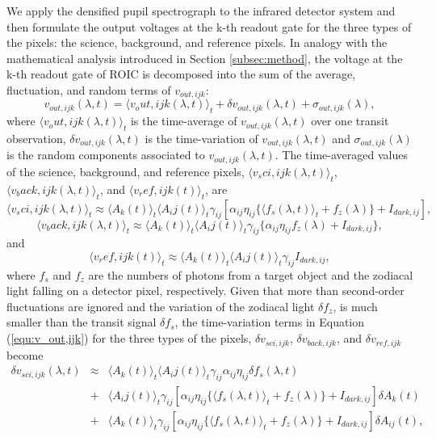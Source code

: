 \documentclass{aastex62}
\def\hoge<#1>{\langle #1 \rangle}
\begin{document}
We apply the densified pupil spectrograph to the infrared detector system and then formulate the output voltages at the k-th readout gate for the three types of the pixels: the science, background, and reference pixels. In analogy with the mathematical analysis introduced in Section \ref{subsec:method}, the voltage at the k-th readout gate of ROIC is decomposed into the sum of the average, fluctuation, and random terms of $v_{out,ijk}$:
\begin{equation}
\label{equ:v_out,ijk}
v_{out,ijk}(\lambda,t) = \hoge<v_{out,ijk}(\lambda,t)>_{t}+{\delta}v_{out,ijk}(\lambda,t)+\sigma_{out,ijk}(\lambda) ,
\end{equation}
where $\hoge<v_{out,ijk}(\lambda,t)>_t$ is the time-average of $v_{out,ijk}(\lambda,t)$ over one transit observation, ${\delta}v_{out,ijk}(\lambda,t)$ is the time-variation of $v_{out,ijk}(\lambda,t)$ and $\sigma_{out,ijk}(\lambda)$ is the random components associated to $v_{out,ijk}(\lambda,t)$. The time-averaged values of the science, background, and reference pixels, $\hoge<v_{sci,ijk}(\lambda,t)>_t$, $\hoge<v_{back,ijk}(\lambda,t)>_t$, and $\hoge<v_{ref,ijk}(t)>_t$, are
\begin{equation}
\label{equ:v_sci,ijk}
\hoge<v_{sci,ijk}(\lambda,t)>_{t} \approx \hoge<A_{k}(t)>_t\hoge<A_{ij}(t)>_{t}\gamma_{ij}[\alpha_{ij}\eta_{ij}\{\hoge<f_{s}(\lambda,t)>_{t}+f_{z}(\lambda)\}+I_{dark,ij}] ,
\end{equation}
\begin{equation}
\hoge<v_{back,ijk}(\lambda,t)>_{t} \approx \hoge<A_{k}(t)>_t\hoge<A_{ij}(t)>_{t}\gamma_{ij}\{\alpha_{ij}\eta_{ij}f_{z}(\lambda)+I_{dark,ij}\} ,
\end{equation}
and
\begin{equation}
\hoge<v_{ref,ijk}(t)>_{t} \approx \hoge<A_{k}(t)>_t\hoge<A_{ij}(t)>_{t}\gamma_{ij}I_{dark,ij} ,
\end{equation}
where $f_s$ and $f_z$ are the numbers of photons from a target object and the zodiacal light falling on a detector pixel, respectively. Given that more than second-order fluctuations are ignored and the variation of the zodiacal light ${\delta}f_z$, is much smaller than the transit signal ${\delta}f_s$, the time-variation terms in Equation (\ref{equ:v_out,ijk}) for the three types of the pixels, ${\delta}v_{sci,ijk}$, ${\delta}v_{back,ijk}$, and ${\delta}v_{ref,ijk}$ become
\begin{eqnarray}
\label{equ:dv_sci}
{\delta}v_{sci,ijk}(\lambda,t) &\approx& \hoge<A_{k}(t)>_t\hoge<A_{ij}(t)>_{t}\gamma_{ij}\alpha_{ij}\eta_{ij}{\delta}f_{s}(\lambda,t) \nonumber \\
&+&\hoge<A_{ij}(t)>_{t}\gamma_{ij}[\alpha_{ij}\eta_{ij}\{\hoge<f_{s}(\lambda,t)>_{t}+f_{z}(\lambda)\}+I_{dark,ij}]{\delta}A_{k}(t) \nonumber \\
&+&\hoge<A_{k}(t)>_{t}\gamma_{ij}[\alpha_{ij}\eta_{ij}\{\hoge<f_{s}(\lambda,t)>_{t}+f_{z}(\lambda)\}+I_{dark,ij}]{\delta}A_{ij}(t) ,
\end{eqnarray}
\end{document}
